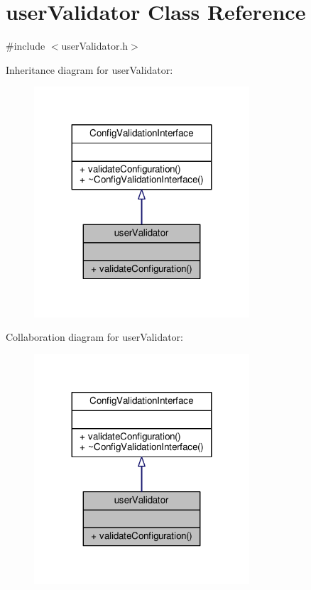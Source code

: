 \hypertarget{classuserValidator}{}\section{user\+Validator Class Reference}
\label{classuserValidator}


{\ttfamily \#include $<$user\+Validator.\+h$>$}



Inheritance diagram for user\+Validator\+:
\nopagebreak
\begin{figure}[H]
\begin{center}
\leavevmode
\includegraphics[width=227pt]{classuserValidator__inherit__graph}
\end{center}
\end{figure}


Collaboration diagram for user\+Validator\+:
\nopagebreak
\begin{figure}[H]
\begin{center}
\leavevmode
\includegraphics[width=227pt]{classuserValidator__coll__graph}
\end{center}
\end{figure}
